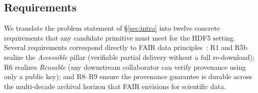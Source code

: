 \documentclass[11pt]{article}
\begin{document}
\subsection{Requirements}
\label{sec:requirements}

We translate the problem statement of \S\ref{sec:intro} into twelve concrete
requirements that any candidate primitive must meet for the HDF5 setting.
Several requirements correspond directly to FAIR data
principles~\cite{wilkinson2016fair}: R1 and R5b realize the \emph{Accessible}
pillar (verifiable partial delivery without a full re-download); R6 realizes
\emph{Reusable} (any downstream collaborator can verify provenance using only
a public key); and R8--R9 ensure the provenance guarantee is durable across
the multi-decade archival horizon that FAIR envisions for scientific data.
\end{document}
